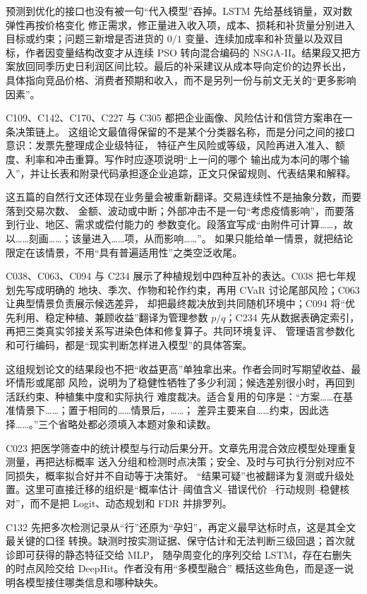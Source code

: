 \documentclass[UTF8,a4paper,12pt]{ctexart}
\begin{document}
预测到优化的接口也没有被一句“代入模型”吞掉。LSTM 先给基线销量，双对数弹性再按价格变化
修正需求，修正量进入收入项，成本、损耗和补货量分别进入目标或约束；问题三新增是否进货的
$0/1$ 变量、连续加成率和补货量以及双目标，作者因变量结构改变才从连续 PSO 转向混合编码的
NSGA-II。结果段又把方案放回同季历史日利润区间比较。最后的补采建议从成本导向定价的边界长出，
具体指向竞品价格、消费者预期和收入，而不是另列一份与前文无关的“更多影响因素”。

C109、C142、C170、C227 与 C305 都把企业画像、风险估计和信贷方案串在一条决策链上。
这组论文最值得保留的不是某个分类器名称，而是分问之间的接口意识：发票先整理成企业级特征，
特征产生风险或等级，风险再进入准入、额度、利率和冲击重算。写作时应逐项说明“上一问的哪个
输出成为本问的哪个输入”，并让长表和附录代码承担逐企业追踪，正文只保留规则、代表结果和解释。

这五篇的自然行文还体现在业务量会被重新翻译。交易连续性不是抽象分数，而要落到交易次数、
金额、波动或中断；外部冲击不是一句“考虑疫情影响”，而要落到行业、地区、需求或偿付能力的
参数变化。段落宜写成“由附件可计算……，故以……刻画……；该量进入……项，从而影响……”。
如果只能给单一情景，就把结论限定在该情景，不用“具有普遍适用性”之类空泛收尾。

C038、C063、C094 与 C234 展示了种植规划中四种互补的表达。C038 把七年规划先写成明确的
地块、季次、作物和轮作约束，再用 CVaR 讨论尾部风险；C063 让典型情景负责展示候选差异，
却把最终裁决放到共同随机环境中；C094 将“优先利用、稳定种植、兼顾收益”翻译为管理参数
$p/q$；C234 先从数据表确定索引，再把三类真实邻接关系写进染色体和修复算子。共同环境复评、
管理语言参数化和可行编码，都是“现实判断怎样进入模型”的具体答案。

这组规划论文的结果段也不把“收益更高”单独拿出来。作者会同时写期望收益、最坏情形或尾部
风险，说明为了稳健性牺牲了多少利润；候选差别很小时，再回到活跃约束、种植集中度和实际执行
难度裁决。适合复用的句序是：“方案……在基准情景下……；置于相同的……情景后，……；
差异主要来自……约束，因此选择……。”三个省略处都必须填入本题对象和读数。

C023 把医学筛查中的统计模型与行动后果分开。文章先用混合效应模型处理重复测量，再把达标概率
送入分组和检测时点决策；安全、及时与可执行分别对应不同损失，概率拟合好并不自动等于决策好。
“结果可疑”也被翻译为复测或升级处置。这里可直接迁移的组织是“概率估计--阈值含义--错误代价
--行动规则--稳健核对”，而不是把 Logit、动态规划和 FDR 并排罗列。

C132 先把多次检测记录从“行”还原为“孕妇”，再定义最早达标时点，这是其全文最关键的口径
转换。缺测时按实测证据、保守估计和无法判断三级回退；首次就诊即可获得的静态特征交给 MLP，
随孕周变化的序列交给 LSTM，存在右删失的时点风险交给 DeepHit。作者没有用“多模型融合”
概括这些角色，而是逐一说明各模型接住哪类信息和哪种缺失。
\end{document}
